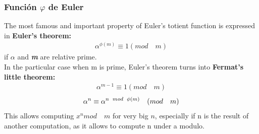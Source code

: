 \documentclass{article}
\begin{document}
\begin{multicols*}{2}
			\subsubsection{Función $\varphi$ de Euler}
			The most famous and important property of Euler's totient function
			 is expressed in \textbf{Euler's theorem:}
			\\
			\begin{align}
				\alpha^{\phi(m)} \equiv 1 (mod  \quad m)
			\end{align}
			if \textbf{\textit{$\alpha$}}
			and \textbf{\textit{m}} 
			are relative prime.\\
			In the particular case when m is prime,
			Euler's theorem turns into \textbf{Fermat's little theorem:}
			\begin{align}
				\alpha^{m-1}\equiv 1 (mod  \quad m)
			\end{align}
			\smallskip
			\begin{align}
				\alpha^{n}\equiv \alpha^{n \enskip mod \enskip\phi(m)} \quad (mod  \quad m)
			\end{align}
			This allows computing $x^{n} mod \quad m$ for very big $n$, especially if
			n is the result of another computation, 
			as it allows to compute n under a modulo.
				
				
								

\end{multicols*}
\end{document}

